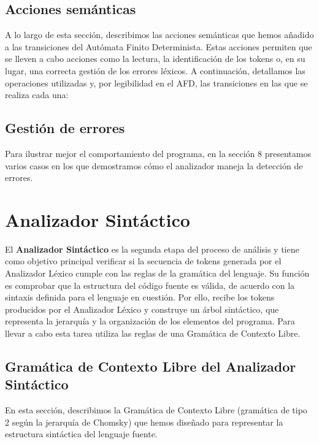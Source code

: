 \documentclass{article}
\begin{document}


\subsection{Acciones semánticas}
A lo largo de esta sección, describimos las acciones semánticas que hemos añadido a las transiciones del Autómata Finito Determinista. Estas acciones permiten que se lleven a cabo acciones como la lectura, la identificación de los tokens o, en su lugar, una correcta gestión de los errores léxicos. A continuación, detallamos las operaciones utilizadas y, por legibilidad en el AFD, las transiciones en las que se realiza cada una:\\


\subsection{Gestión de errores}


Para ilustrar mejor el comportamiento del programa, en la sección 8 presentamos varios casos en los que demostramos cómo el analizador maneja la detección de errores.

\section{Analizador Sintáctico}
El \textbf{Analizador Sintáctico} es la segunda etapa del proceso de análisis y tiene como objetivo principal verificar si la secuencia de tokens generada por el Analizador Léxico cumple con las reglas de la gramática del lenguaje. Su función es comprobar que la estructura del código fuente es válida, de acuerdo con la sintaxis definida para el lenguaje en cuestión. Por ello, recibe los tokens producidos por el Analizador Léxico y construye un árbol sintáctico, que representa la jerarquía y la organización de los elementos del programa. Para llevar a cabo esta tarea utiliza las reglas de una Gramática de Contexto Libre.

\subsection{Gramática de Contexto Libre del Analizador Sintáctico}

En esta sección, describimos la Gramática de Contexto Libre (gramática de tipo 2 según la jerarquía de Chomsky) que hemos diseñado para representar la estructura sintáctica del lenguaje fuente.
\end{document}
